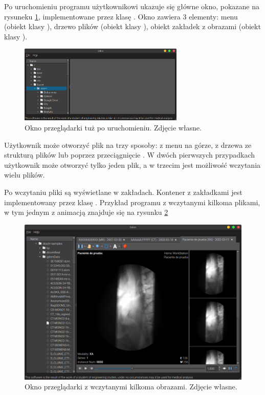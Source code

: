 \label{sec:sokar-gui}

\par
Po uruchomieniu programu użytkownikowi ukazuje się główne okno, pokazane na rysuneku \ref{fig:sokar-gui-empty-window}, implementowane przez klasę .
Okno zawiera 3 elementy: menu (obiekt klasy ), drzewo plików (obiekt klasy ), obiekt zakładek z obrazami (obiekt klasy ).

\begin{figure}[!htbp]
    \centering
    \includegraphics[width=0.7\textwidth]{img/sokar-gui-001.png}
    \caption{Okno przeglądarki tuż po uruchomieniu. Zdjęcie własne.}
    \label{fig:sokar-gui-empty-window}
\end{figure}

\par
Użytkownik może otworzyć plik \DICOM na trzy sposoby: z menu na górze, z drzewa ze strukturą plików lub poprzez przeciągnięcie .
W dwóch pierwszych przypadkach użytkownik może otworzyć tylko jeden plik, a w trzecim jest możliwość wczytania wielu plików.

\par
Po wczytaniu pliki są wyświetlane w zakładach.
Kontener z zakładkami jest implementowany przez klasę .
Przykład programu z wczytanymi kilkoma plikami, w tym jednym z animacją znajduje się na rysunku \ref{fig:sokar-gui-with-files}

\begin{figure}[!htbp]
    \centering
    \includegraphics[width=\textwidth]{img/sokar-gui-002.png}
    \caption{Okno przeglądarki z wczytanymi kilkoma obrazami. Zdjęcie własne.}
    \label{fig:sokar-gui-with-files}
\end{figure}

